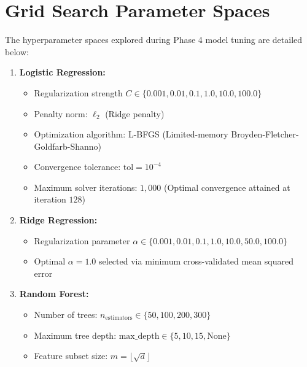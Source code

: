 \documentclass[12pt,a4paper,oneside]{report}
\begin{document}
\section{Grid Search Parameter Spaces}
The hyperparameter spaces explored during Phase 4 model tuning are detailed below:
\begin{enumerate}
    \item \textbf{Logistic Regression:}
    \begin{itemize}
        \item Regularization strength $C \in \{0.001, 0.01, 0.1, 1.0, 10.0, 100.0\}$
        \item Penalty norm: $\ell_2$ (Ridge penalty)
        \item Optimization algorithm: L-BFGS (Limited-memory Broyden-Fletcher-Goldfarb-Shanno)
        \item Convergence tolerance: $\text{tol} = 10^{-4}$
        \item Maximum solver iterations: $1,000$ (Optimal convergence attained at iteration $128$)
    \end{itemize}
    \item \textbf{Ridge Regression:}
    \begin{itemize}
        \item Regularization parameter $\alpha \in \{0.001, 0.01, 0.1, 1.0, 10.0, 50.0, 100.0\}$
        \item Optimal $\alpha = 1.0$ selected via minimum cross-validated mean squared error
    \end{itemize}
    \item \textbf{Random Forest:}
    \begin{itemize}
        \item Number of trees: $n_{\text{estimators}} \in \{50, 100, 200, 300\}$
        \item Maximum tree depth: $\text{max\_depth} \in \{5, 10, 15, \text{None}\}$
        \item Feature subset size: $m = \lfloor \sqrt{d} \rfloor$
    \end{itemize}
\end{enumerate}
\end{document}
